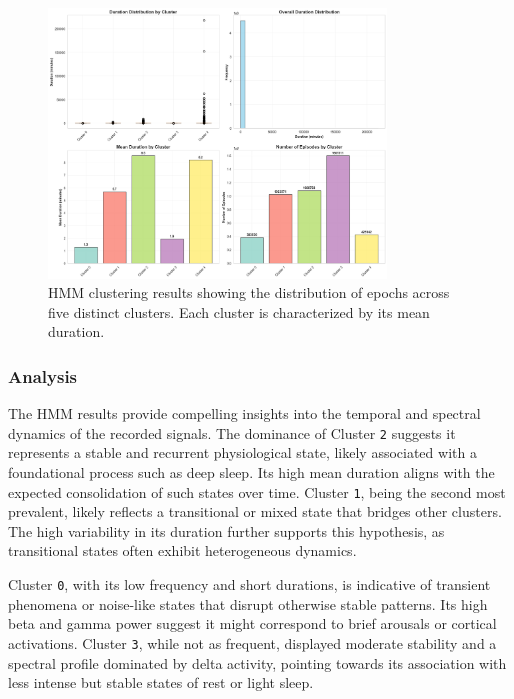 \documentclass[a4paper,12pt,twoside]{article}
\begin{document}
\begin{figure}[H]
    \centering
    \includegraphics[width=0.8\textwidth]{img/HMM results.png}
    \caption{HMM clustering results showing the distribution of epochs across five distinct clusters. Each cluster is characterized by its mean duration.}
    \label{fig:hmm_clusters}
\end{figure}



\subsubsection{Analysis}

The HMM results provide compelling insights into the temporal and spectral dynamics of the recorded signals. The dominance of Cluster \texttt{2} suggests it represents a stable and recurrent physiological state, likely associated with a foundational process such as deep sleep. Its high mean duration aligns with the expected consolidation of such states over time. Cluster \texttt{1}, being the second most prevalent, likely reflects a transitional or mixed state that bridges other clusters. The high variability in its duration further supports this hypothesis, as transitional states often exhibit heterogeneous dynamics.

Cluster \texttt{0}, with its low frequency and short durations, is indicative of transient phenomena or noise-like states that disrupt otherwise stable patterns. Its high beta and gamma power suggest it might correspond to brief arousals or cortical activations. Cluster \texttt{3}, while not as frequent, displayed moderate stability and a spectral profile dominated by delta activity, pointing towards its association with less intense but stable states of rest or light sleep.
\end{document}
